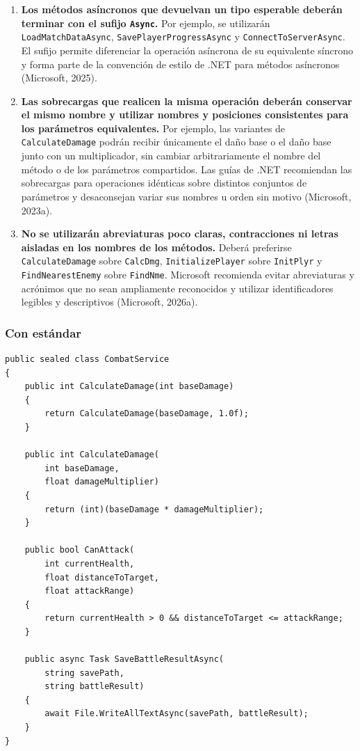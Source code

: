 \begin{enumerate}
  \item \textbf{Los métodos asíncronos que devuelvan un tipo esperable deberán terminar con el sufijo \texttt{Async}.} Por ejemplo, se utilizarán \texttt{LoadMatchDataAsync}, \texttt{SavePlayerProgressAsync} y \texttt{ConnectToServerAsync}. El sufijo permite diferenciar la operación asíncrona de su equivalente síncrono y forma parte de la convención de estilo de .NET para métodos asíncronos (Microsoft, 2025).

  \item \textbf{Las sobrecargas que realicen la misma operación deberán conservar el mismo nombre y utilizar nombres y posiciones consistentes para los parámetros equivalentes.} Por ejemplo, las variantes de \texttt{CalculateDamage} podrán recibir únicamente el daño base o el daño base junto con un multiplicador, sin cambiar arbitrariamente el nombre del método o de los parámetros compartidos. Las guías de .NET recomiendan las sobrecargas para operaciones idénticas sobre distintos conjuntos de parámetros y desaconsejan variar sus nombres u orden sin motivo (Microsoft, 2023a).

  \item \textbf{No se utilizarán abreviaturas poco claras, contracciones ni letras aisladas en los nombres de los métodos.} Deberá preferirse \texttt{CalculateDamage} sobre \texttt{CalcDmg}, \texttt{InitializePlayer} sobre \texttt{InitPlyr} y \texttt{FindNearestEnemy} sobre \texttt{FindNme}. Microsoft recomienda evitar abreviaturas y acrónimos que no sean ampliamente reconocidos y utilizar identificadores legibles y descriptivos (Microsoft, 2026a).
\end{enumerate}

\subsubsection{Con estándar}

\begin{lstlisting}[style=csharpstyle]
public sealed class CombatService
{
    public int CalculateDamage(int baseDamage)
    {
        return CalculateDamage(baseDamage, 1.0f);
    }

    public int CalculateDamage(
        int baseDamage,
        float damageMultiplier)
    {
        return (int)(baseDamage * damageMultiplier);
    }

    public bool CanAttack(
        int currentHealth,
        float distanceToTarget,
        float attackRange)
    {
        return currentHealth > 0 && distanceToTarget <= attackRange;
    }

    public async Task SaveBattleResultAsync(
        string savePath,
        string battleResult)
    {
        await File.WriteAllTextAsync(savePath, battleResult);
    }
}
\end{lstlisting}

